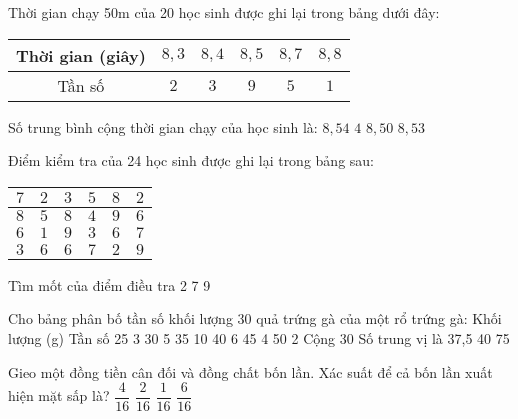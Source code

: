\begin{ex}
 Thời gian chạy 50m của 20 học sinh được ghi lại trong bảng dưới đây:
\begin{center}
\begin{tabular}{|c|c|c|c|c|c|}
\hline
Thời gian (giây) & $8{,}3$ & $8{,}4$ & $8{,}5$ & $8{,}7$& $8{,}8$ \\
\hline
Tần số & $2$ & $3$ & $9$ & $5$ & $1$\\
\hline
\end{tabular}
\end{center}
Số trung bình cộng thời gian chạy của học sinh là:
\choice
{$8{,}54$}
{$4$}
{$8{,}50$}
{\True $8{,}53$}
\end{ex}
\begin{ex}
 Điểm kiểm tra của 24 học sinh được ghi lại trong bảng sau:
\begin{center}
\begin{tabular}{|c|c|c|c|c|c|}
\hline
$7$ & $2$ & $3$ & $5$ & $8$ & $2$\\ \hline $8$ & $5$ & $8$ & $4$ & $9$ & $6$\\ \hline $6$ & $1$ & $9$ & $3$ & $6$ & $7$\\ \hline $3$ & $6$ & $6$ & $7$ & $2$ & $9$\\ \hline
\end{tabular}
\end{center}
Tìm mốt của điểm điều tra
\choice
{2}
{7}
{}
{9}
\end{ex}
\begin{ex}
 Cho bảng phân bố tần số khối lượng 30 quả trứng gà của một rổ trứng gà:
Khối lượng (g)	Tần số
25	3
30	5
35	10
40	6
45	4
50	2
Cộng	30
Số trung vị là 
\choice
{37{,}5}
{40}
{}
{75}
\end{ex}
\begin{ex}
Gieo một đồng tiền cân đối và đồng chất bốn lần. Xác suất để cả bốn lần xuất hiện mặt sấp là?
\choice
{$\dfrac{4}{16}$}
{$\dfrac{2}{16}$}
{\True $\dfrac{1}{16}$}
{$\dfrac{6}{16}$}
\end{ex}
